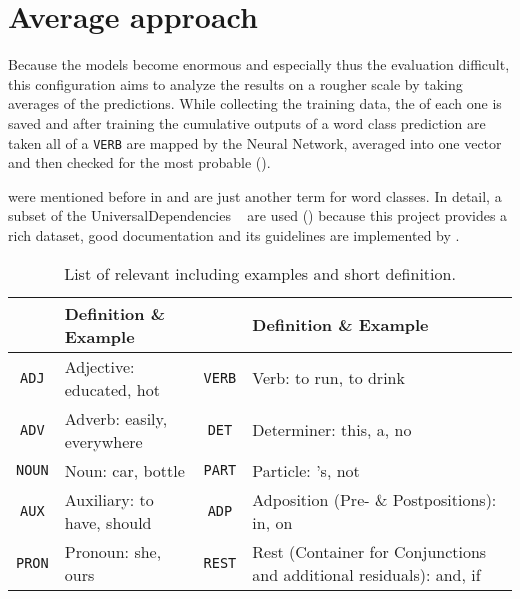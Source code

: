 \section{Average approach} \label{subsubsec: average approach}
Because the models become enormous and  especially thus the evaluation difficult, this configuration aims to analyze the results on a rougher scale by taking averages of the predictions. While collecting the training data, the \postag{} of each one is saved and after training the cumulative outputs of a word class prediction are taken \ie all  of a \texttt{VERB} are mapped by the Neural Network, averaged into one vector and then checked for the most probable  ().

 were mentioned before in  and are just another term for word classes. In detail, a subset of the UniversalDependencies ~\cite{udpostags} are used (\tabref{\ref{tab: ud pos tags}}) because this project provides a rich dataset, good documentation and its guidelines are implemented by \spacy{}.
\begin{table}
	\centering
	\caption[Listing of .]{List of relevant  including examples and short definition.}
	\begin{tabular}{cl|cl}
		\toprule
		\postag{} 	  & Definition \& Example 		& \postag{} 		& Definition \& Example \\
		\midrule
		\texttt{ADJ}  & Adjective: educated, hot 	& \texttt{VERB} 	& Verb: to run, to drink \\
		\texttt{ADV}  & Adverb: easily, everywhere	& \texttt{DET} 		& Determiner: this, a, no \\
		\texttt{NOUN} & Noun: car, bottle 			& \texttt{PART}		& Particle: 's, not \\
		\texttt{AUX}  & Auxiliary: to have, should 	& \texttt{ADP}		& Adposition (Pre- \& Postpositions): in, on \\
		\texttt{PRON} & Pronoun: she, ours 			& \texttt{REST}		& \parbox{7cm}{Rest (Container for Conjunctions and additional residuals): and, if}\\
		\bottomrule
	\end{tabular}
	\label{tab: ud pos tags}
\end{table}
